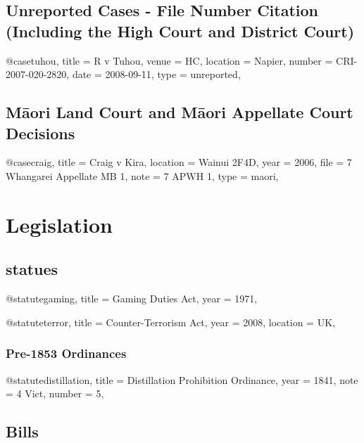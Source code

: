 \documentclass{book}
\begin{document}
\section{Unreported Cases - File Number Citation (Including the High Court and District Court)}

\begin{bib}
@case{tuhou,
title = {R v Tuhou},
venue = {HC},
location = {Napier},
number = {CRI-2007-020-2820},
date = {2008-09-11},
type = {unreported},
}
\end{bib}

\section{M\=aori Land Court and M\=aori Appellate Court Decisions}

\begin{bib}
@case{craig,
title = {Craig v Kira},
location = {Wainui 2F4D},
year = {2006},
file = {7 Whangarei Appellate MB 1},
note = {7 APWH 1},
type = {maori},
}
\end{bib}


\chapter{Legislation}

\section{statues}
\begin{bib}
@statute{gaming,
title = {Gaming Duties Act},
year = {1971},
}
\end{bib}
\begin{bib}
@statute{terror,
title = {Counter-Terrorism Act},
year = {2008},
location = {UK},
}
\end{bib}
\subsection{Pre-1853 Ordinances}

\begin{bib}
@statute{distillation,
title = {Distillation Prohibition Ordinance},
year = {1841},
note = {4 Vict},
number = {5},
}
\end{bib}


\section{Bills}
\end{document}
